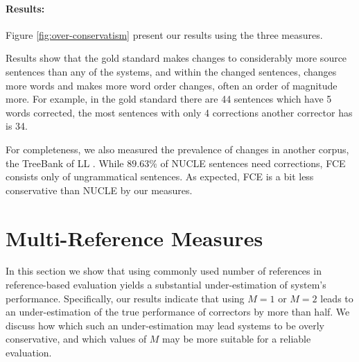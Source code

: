 \documentclass[letter,11pt]{article}
\begin{document}
		\paragraph{Results:}
		Figure \ref{fig:over-conservatism} present our results using the three measures. %
		
		Results show that the gold standard makes changes to considerably more source sentences than any of the systems, and within the changed sentences, changes more words and makes more word order changes, often an order of magnitude more. For example, in the gold standard there are 44 sentences which have 5 words corrected, the most sentences with only 4 corrections another corrector has is 34.
		
		For completeness, we also measured the prevalence of changes in
		another corpus, the TreeBank of LL \cite[FCE]{yannakoudakis2011new}.
		While $89.63\%$ of NUCLE sentences need corrections, FCE consists only of ungrammatical sentences. As expected, FCE is a bit less conservative than NUCLE by our measures.
		
		
		\section{Multi-Reference Measures}\label{sec:increase-reference}
		
		In this section we show that using commonly used number of references in reference-based evaluation yields a substantial under-estimation of system's performance. Specifically, our results indicate that using $M=1$ or $M=2$ leads to an under-estimation of the true performance of correctors by more than half.
		We discuss how which such an under-estimation may lead systems to be
		overly conservative, and which values of $M$ may be more suitable for
		a reliable evaluation.
		
		
\end{document}
